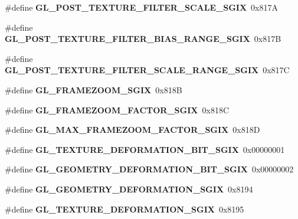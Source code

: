 \begin{DoxyCompactItemize}
\item 
\#define {\bfseries G\+L\+\_\+\+P\+O\+S\+T\+\_\+\+T\+E\+X\+T\+U\+R\+E\+\_\+\+F\+I\+L\+T\+E\+R\+\_\+\+S\+C\+A\+L\+E\+\_\+\+S\+G\+I\+X}~0x817\+A\label{_s_d_l__opengl_8h_abacc0f90d50e3666e0b494f21df8f540}

\item 
\#define {\bfseries G\+L\+\_\+\+P\+O\+S\+T\+\_\+\+T\+E\+X\+T\+U\+R\+E\+\_\+\+F\+I\+L\+T\+E\+R\+\_\+\+B\+I\+A\+S\+\_\+\+R\+A\+N\+G\+E\+\_\+\+S\+G\+I\+X}~0x817\+B\label{_s_d_l__opengl_8h_a8b9cc74e42f595634e8ac9a810605d25}

\item 
\#define {\bfseries G\+L\+\_\+\+P\+O\+S\+T\+\_\+\+T\+E\+X\+T\+U\+R\+E\+\_\+\+F\+I\+L\+T\+E\+R\+\_\+\+S\+C\+A\+L\+E\+\_\+\+R\+A\+N\+G\+E\+\_\+\+S\+G\+I\+X}~0x817\+C\label{_s_d_l__opengl_8h_aea071ea7e8353e234fe32ed46b9d7846}

\item 
\#define {\bfseries G\+L\+\_\+\+F\+R\+A\+M\+E\+Z\+O\+O\+M\+\_\+\+S\+G\+I\+X}~0x818\+B\label{_s_d_l__opengl_8h_ab8e649db34de6d5eef689ec4fb008ea6}

\item 
\#define {\bfseries G\+L\+\_\+\+F\+R\+A\+M\+E\+Z\+O\+O\+M\+\_\+\+F\+A\+C\+T\+O\+R\+\_\+\+S\+G\+I\+X}~0x818\+C\label{_s_d_l__opengl_8h_a5e1b99cc3cfe0a92c5196e561c9e126f}

\item 
\#define {\bfseries G\+L\+\_\+\+M\+A\+X\+\_\+\+F\+R\+A\+M\+E\+Z\+O\+O\+M\+\_\+\+F\+A\+C\+T\+O\+R\+\_\+\+S\+G\+I\+X}~0x818\+D\label{_s_d_l__opengl_8h_ab38b025240200336dc98231ea68d2a1e}

\item 
\#define {\bfseries G\+L\+\_\+\+T\+E\+X\+T\+U\+R\+E\+\_\+\+D\+E\+F\+O\+R\+M\+A\+T\+I\+O\+N\+\_\+\+B\+I\+T\+\_\+\+S\+G\+I\+X}~0x00000001\label{_s_d_l__opengl_8h_aa737e1c3cb47c0b132ddf16fa602151e}

\item 
\#define {\bfseries G\+L\+\_\+\+G\+E\+O\+M\+E\+T\+R\+Y\+\_\+\+D\+E\+F\+O\+R\+M\+A\+T\+I\+O\+N\+\_\+\+B\+I\+T\+\_\+\+S\+G\+I\+X}~0x00000002\label{_s_d_l__opengl_8h_a69a772d206d2ca96bd26a1732ea44188}

\item 
\#define {\bfseries G\+L\+\_\+\+G\+E\+O\+M\+E\+T\+R\+Y\+\_\+\+D\+E\+F\+O\+R\+M\+A\+T\+I\+O\+N\+\_\+\+S\+G\+I\+X}~0x8194\label{_s_d_l__opengl_8h_ac88f142424cf49c09af72490a531fef6}

\item 
\#define {\bfseries G\+L\+\_\+\+T\+E\+X\+T\+U\+R\+E\+\_\+\+D\+E\+F\+O\+R\+M\+A\+T\+I\+O\+N\+\_\+\+S\+G\+I\+X}~0x8195\label{_s_d_l__opengl_8h_aef9d3b9ca1984a732cbccf1076f88110}


\end{DoxyCompactItemize}

